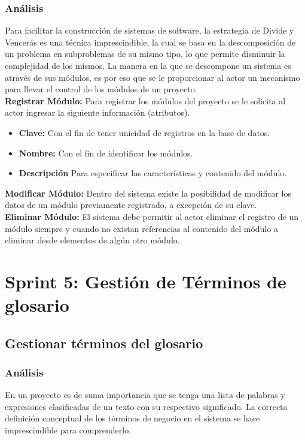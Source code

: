 \subsubsection {Análisis}
Para facilitar la construcción de sistemas de software, la estrategia de Divide y Vencerás es una técnica imprescindible, la cual se basa en la descomposición de un problema en subproblemas de su mismo tipo, lo que permite disminuir la complejidad de los mismos. La manera en la que se descompone un sistema es através de sus módulos, es por eso que se le proporcionar al actor un mecanismo para llevar el control de los módulos de un proyecto. \\

\textbf {Registrar Módulo:}
Para registrar los módulos del proyecto se le solicita al actor ingresar la siguiente información (atributos).

\begin{itemize}
	\item \textbf{Clave:} Con el fin de tener unicidad de registros en la base de datos.
	\item \textbf{Nombre:} Con el fin de identificar los módulos.
	\item \textbf{Descripción} Para especificar las características y contenido del módulo.
\end{itemize}

\textbf {Modificar Módulo:}
Dentro del sistema existe la posibilidad de modificar los datos de un módulo previamente registrado, a excepción de su clave.\\

\textbf {Eliminar Módulo:} 
El sistema debe permitir al actor eliminar el registro de un módulo siempre y cuando no existan referencias al contenido del módulo a eliminar desde elementos de algún otro módulo.

\section{Sprint 5: Gestión de Términos de glosario}
\subsection{Gestionar términos del glosario}

\subsubsection {Análisis}
En un proyecto es de suma importancia que se tenga una lista de palabras y expresiones clasificadas de un texto con su respectivo significado. La correcta definición conceptual de los términos de negocio en el sistema se hace imprescindible para comprenderlo.

